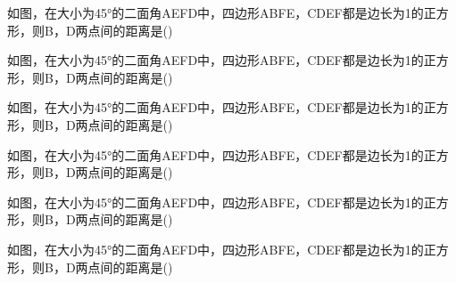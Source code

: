 \documentclass[fontset=none]{ctexart}
\begin{document}
\noindent\begin{minipage}[t]{44.000mm}\raggedright 如图，在大小为45°的二面角A\-EF\-D中，四边形ABFE，CDEF都是边长为1的正方形，则B，D两点间的距离是\nobreak\mbox{}\nobreak\hfill(\kongwei)\hspace{0.56mm}\end{minipage}\par\newpage
\noindent\begin{minipage}[t]{44.500mm}\raggedright 如图，在大小为45°的二面角A\-EF\-D中，四边形ABFE，CDEF都是边长为1的正方形，则B，D两点间的距离是\nobreak\mbox{}\nobreak\hfill(\kongwei)\hspace{0.56mm}\end{minipage}\par\newpage
\noindent\begin{minipage}[t]{45.000mm}\raggedright 如图，在大小为45°的二面角A\-EF\-D中，四边形ABFE，CDEF都是边长为1的正方形，则B，D两点间的距离是\nobreak\mbox{}\nobreak\hfill(\kongwei)\hspace{0.56mm}\end{minipage}\par\newpage
\noindent\begin{minipage}[t]{45.200mm}\raggedright 如图，在大小为45°的二面角A\-EF\-D中，四边形ABFE，CDEF都是边长为1的正方形，则B，D两点间的距离是\nobreak\mbox{}\nobreak\hfill(\kongwei)\hspace{0.56mm}\end{minipage}\par\newpage
\noindent\begin{minipage}[t]{45.500mm}\raggedright 如图，在大小为45°的二面角A\-EF\-D中，四边形ABFE，CDEF都是边长为1的正方形，则B，D两点间的距离是\nobreak\mbox{}\nobreak\hfill(\kongwei)\hspace{0.56mm}\end{minipage}\par\newpage
\noindent\begin{minipage}[t]{46.368mm}\raggedright 如图，在大小为45°的二面角A\-EF\-D中，四边形ABFE，CDEF都是边长为1的正方形，则B，D两点间的距离是\nobreak\mbox{}\nobreak\hfill(\kongwei)\hspace{0.56mm}\end{minipage}\par\newpage
\end{document}
